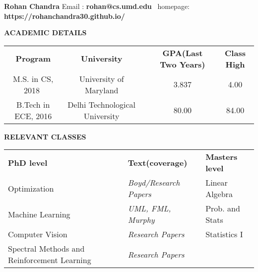 \documentclass[a4paper,8pt]{article}
\newcommand{\resheading}[1]{\begin{tcolorbox} \begin{center} #1 \end{center} \end{tcolorbox}}
\begin{document}

\textbf{\large{Rohan Chandra}} 
\indent Email : \textbf{rohan@cs.umd.edu}  \ homepage: \textbf{https://rohanchandra30.github.io/}\\

\resheading{\textbf{ACADEMIC DETAILS} }
\indent \begin{tabular}{ c @{\hskip 1in} c @{\hskip 1in} c @{\hskip .5in} c @{\hskip .5in} c @{\hskip 0.4in} }
\textbf{Program} & \multicolumn{1}{c}{\textbf{University}} &  & \textbf{GPA(\small{Last Two Years})} & \textbf{Class High}\\
M.S. in CS, 2018\,\, & \multicolumn{1}{c}{University of Maryland} & & {3.837	} & {4.00}\\
B.Tech in ECE, 2016 & \multicolumn{1}{c}{Delhi Technological University} & & {80.00} & {84.00}\\
\end{tabular}


\resheading{\textbf{RELEVANT CLASSES} }
\indent \begin{tabular}{ l @{\hskip 1.1in} l @{\hskip 1.1in} l @{\hskip 1.1in}  }
\textbf{PhD level} & \textbf{Text(coverage)} & \textbf{Masters level}   \\
Optimization & \textit{Boyd/Research Papers} & Linear Algebra  \\
Machine Learning & \textit{UML, FML, Murphy} & Prob. and Stats  \\
Computer Vision & \textit{Research Papers} &  Statistics I\\
Spectral Methods and Reinforcement Learning & \textit{Research Papers}
\end{tabular}
\end{document}
